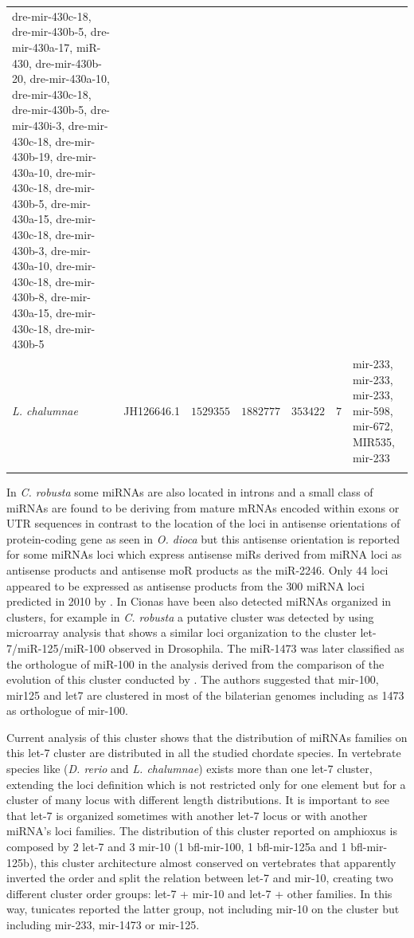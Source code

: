 \documentclass[graybox]{svmult}
\begin{document}
\begin{small}
\begin{center}
\begin{longtable}{p{2.0 cm}p{2 cm}p{2 cm}p{2 cm}p{1.2 cm}p{1.0 cm}p{2.6 cm}}
{dre-mir-430c-18, dre-mir-430b-5, dre-mir-430a-17, miR-430, dre-mir-430b-20, 
dre-mir-430a-10, dre-mir-430c-18, dre-mir-430b-5, dre-mir-430i-3, 
dre-mir-430c-18, dre-mir-430b-19, dre-mir-430a-10, dre-mir-430c-18, 
dre-mir-430b-5, dre-mir-430a-15, dre-mir-430c-18, dre-mir-430b-3, 
dre-mir-430a-10, dre-mir-430c-18, dre-mir-430b-8, dre-mir-430a-15, 
dre-mir-430c-18, dre-mir-430b-5} \\
\textit{L. chalumnae} & JH126646.1 & $1529355$ & $1882777$ & $353422$ & $7$ & 
mir-233, mir-233, mir-233, mir-598, mir-672, MIR535, mir-233 \\
\hline\noalign{\smallskip}
\end{longtable}
\end{center}
\end{small}

In \textit{C. robusta} some miRNAs are also located in introns and a small 
class of miRNAs are found to be deriving from mature mRNAs encoded within exons 
or UTR sequences \cite{Hendrix2010} in contrast to the location of the  loci in 
antisense orientations of protein-coding gene as seen in \textit{O. dioca} but 
this antisense orientation is reported for some miRNAs loci which express 
antisense miRs derived from miRNA loci as antisense products and antisense moR 
products as the miR-2246. Only $44$ loci appeared to be expressed as antisense 
products from the $300$ miRNA loci predicted in 2010 by \cite{Hendrix2010}. In 
Cionas have been also detected miRNAs organized in clusters, for example in  
\textit{C. robusta} a putative cluster was detected by \cite{Keshavan2010} 
using microarray analysis that shows a similar loci organization to the cluster 
let-7/miR-125/miR-100 observed in Drosophila. The miR-1473 was later classified 
as the orthologue of miR-100 in the analysis derived from the comparison of the 
evolution of this cluster conducted by \cite{Griffiths-Jones2011}. The authors 
suggested that mir-100, mir125 and let7 are clustered in most of the bilaterian 
genomes including as 1473 as orthologue of mir-100. 

Current analysis of this cluster shows that the distribution of miRNAs families 
on this let-7 cluster are distributed in all the studied chordate species. In 
vertebrate species like (\textit{D. rerio} and \textit{L. chalumnae}) exists 
more than one let-7 cluster, extending the loci definition which is not 
restricted only for one element but for a cluster of many locus with different 
length distributions. It is important to see that let-7 is organized sometimes 
with another let-7 locus or with another miRNA's loci families. The 
distribution of this cluster reported on amphioxus is composed by 2 let-7 and 3 
mir-10 (1 bfl-mir-100, 1 bfl-mir-125a and 1 bfl-mir-125b), this 
cluster architecture almost conserved on vertebrates that apparently inverted 
the order and split the relation between let-7 and mir-10, creating two 
different cluster order groups: let-7 + mir-10 and let-7 + other families. 
In this way, tunicates reported the latter group, not including mir-10 on the 
cluster but including mir-233, mir-1473 or mir-125. 
\end{document}
